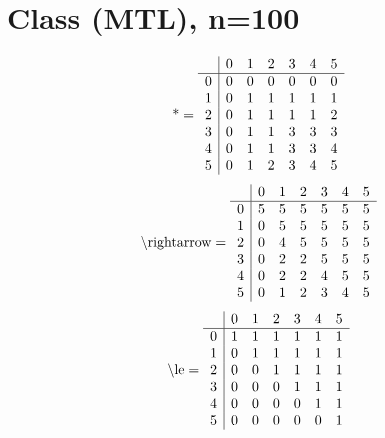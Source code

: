 \documentclass[11pt]{article}
\begin{document}
\section{Class (MTL), n=100}
\[\text{*} = 
\begin{array}{r | r r r r r r}
 & 0 & 1 & 2 & 3 & 4 & 5 \\ \hline
0 & 0 & 0 & 0 & 0 & 0 & 0 \\
1 & 0 & 1 & 1 & 1 & 1 & 1 \\
2 & 0 & 1 & 1 & 1 & 1 & 2 \\
3 & 0 & 1 & 1 & 3 & 3 & 3 \\
4 & 0 & 1 & 1 & 3 & 3 & 4 \\
5 & 0 & 1 & 2 & 3 & 4 & 5 \\
\end{array}
\]
\[\text{\textbackslash rightarrow} = 
\begin{array}{r | r r r r r r}
 & 0 & 1 & 2 & 3 & 4 & 5 \\ \hline
0 & 5 & 5 & 5 & 5 & 5 & 5 \\
1 & 0 & 5 & 5 & 5 & 5 & 5 \\
2 & 0 & 4 & 5 & 5 & 5 & 5 \\
3 & 0 & 2 & 2 & 5 & 5 & 5 \\
4 & 0 & 2 & 2 & 4 & 5 & 5 \\
5 & 0 & 1 & 2 & 3 & 4 & 5 \\
\end{array}
\]
\[\text{\textbackslash le} = 
\begin{array}{r | r r r r r r}
 & 0 & 1 & 2 & 3 & 4 & 5 \\ \hline
0 & 1 & 1 & 1 & 1 & 1 & 1 \\
1 & 0 & 1 & 1 & 1 & 1 & 1 \\
2 & 0 & 0 & 1 & 1 & 1 & 1 \\
3 & 0 & 0 & 0 & 1 & 1 & 1 \\
4 & 0 & 0 & 0 & 0 & 1 & 1 \\
5 & 0 & 0 & 0 & 0 & 0 & 1 \\
\end{array}
\]
\end{document}
